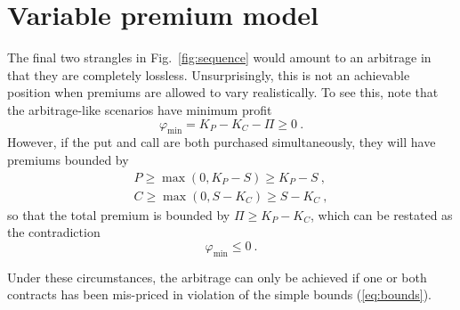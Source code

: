 \documentclass[aps,reprint]{revtex4-2}
\begin{document}
\section{Variable premium model}

The final two strangles in Fig.~\ref{fig:sequence} would amount to an arbitrage in that they are completely lossless.  Unsurprisingly, this is not an achievable position when premiums are allowed to vary realistically.  To see this, note that the arbitrage-like scenarios have minimum profit
\begin{equation}
\varphi_{\min} = K_P - K_C - \Pi \geq 0~.
\end{equation}
However, if the put and call are both purchased simultaneously, they will have premiums bounded by 
\begin{subequations} \label{eq:bounds}
\begin{align}
P \geq \max(0, K_P - S) \geq K_P - S~,\\
C \geq \max(0, S - K_C) \geq S - K_C~,
\end{align}
\end{subequations}
so that the total premium is bounded by $\Pi \geq K_P - K_C$, which can be restated as the contradiction
\begin{equation}
\varphi_{\min} \leq 0~.
\end{equation}

Under these circumstances, the arbitrage can only be achieved if one or both contracts has been mis-priced in violation of the simple bounds (\ref{eq:bounds}).  
\end{document}
